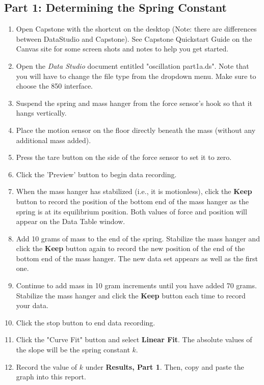 \documentclass[twocolumn,english]{IEEEtran}
\theoremstyle{plain}
\theoremstyle{plain}
\begin{document}
\subsection*{Part 1: Determining the Spring Constant}
\begin{enumerate}
  \item
   Open Capstone with the shortcut on the desktop (Note: there are differences between DataStudio and Capstone).
   See Capstone Quickstart Guide on the Canvas site for some screen shots and notes to help you get started.
  \item
   Open the \textit{Data Studio} document entitled "oscillation part1a.ds".
   Note that you will have to change the file type from the dropdown menu. Make sure to choose the 850 interface.
  \item
   Suspend the spring and mass hanger from the force sensor's hook so that it hangs vertically.
  \item
   Place the motion sensor on the floor directly beneath the mass (without any additional mass added).
  \item
   Press the tare button on the side of the force sensor to set it to zero.
  \item
   Click the 'Preview' button to begin data recording.
  \item
   When the mass hanger has stabilized (i.e., it is motionless), click the \textbf{Keep} button to record the position of the bottom end of the mass hanger as the spring is at its equilibrium position.
   Both values of force and position will appear on the Data Table window.
  \item
   Add 10 grams of mass to the end of the spring. Stabilize the mass hanger and click the \textbf{Keep} button again to record the new position of the end of the bottom end of the mass hanger.
   The new data set appears as well as the first one.
  \item
   Continue to add mass in 10 gram increments until you have added 70 grams.
   Stabilize the mass hanger and click the \textbf{Keep} button each time to record your data.
  \item
   Click the stop button to end data recording.
  \item
   Click the "Curve Fit" button and select \textbf{Linear Fit}.
   The absolute values of the slope will be the spring constant $k$.
  \item
   Record the value of $k$ under \textbf{Results, Part 1}.
   Then, copy and paste the graph into this report.
\end{enumerate}
\end{document}

